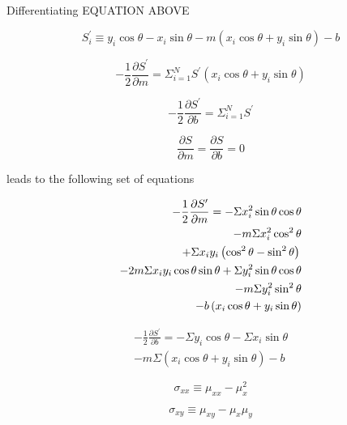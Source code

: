 \documentclass{article}
\newcommand{\meanx}{\ensuremath{\mu_{x}}}
\newcommand{\meanxsquared}{\ensuremath{\mu_{x}^{2}}}
\newcommand{\meany}{\ensuremath{\mu_{y}}}
\newcommand{\meanxx}{\ensuremath{\mu_{xx}}}
\newcommand{\meanxy}{\ensuremath{\mu_{xy}}}
\newcommand{\sxx}{\ensuremath{\sigma_{xx}}}
\newcommand{\sxy}{\ensuremath{\sigma_{xy}}}
\begin{document}
Differentiating EQUATION ABOVE

\begin{equation}
S^{\prime}_{i} \equiv y_{i} \cos \theta - x_{i} \sin \theta - m \left( x_{i} \cos \theta + y_{i} \sin \theta \right) - b
\end{equation}

\begin{equation}
-\frac{1}{2}\frac{\partial S^{\prime}}{\partial m} = \Sigma_{i=1}^{N} S^{\prime} \left( x_{i} \cos \theta + y_{i} \sin \theta \right)
\end{equation}

\begin{equation}
-\frac{1}{2}\frac{\partial S^{\prime}}{\partial b} = \Sigma_{i=1}^{N} S^{\prime} 
\end{equation}

\begin{equation}
\frac{\partial S}{\partial m} = \frac{\partial S}{\partial b} = 0
\end{equation}

leads to the following set of equations

\begin{eqnarray}
-\frac{1}{2}\frac{\partial S^{\prime}}{\partial m} = 
- \Sigma x_{i}^{2} \sin \theta \cos \theta \\
- m \Sigma x_{i}^{2} \cos^{2} \theta \\
+ \Sigma x_{i} y_{i} \left( \cos^{2} \theta - \sin^{2} \theta \right) \newline \\
- 2m \Sigma x_{i} y_{i} \cos \theta \sin \theta \newline
+ \Sigma y_{i}^{2} \sin \theta \cos \theta \\
- m \Sigma y_{i}^{2} \sin^{2} \theta \\
- b \left( x_{i} \cos \theta + y_{i} \sin \theta \right)
\end{eqnarray}

\begin{eqnarray}
-\frac{1}{2}\frac{\partial S^{\prime}}{\partial b} = 
- \Sigma y_{i} \cos \theta - \Sigma x_{i} \sin \theta \\
- m \Sigma \left( x_{i} \cos \theta + y_{i} \sin \theta \right) - b
\end{eqnarray}


\begin{equation}
\sxx \equiv \meanxx - {\meanxsquared}
\end{equation}

\begin{equation}
\sxy \equiv \meanxy - \meanx \meany
\end{equation}
\end{document}
